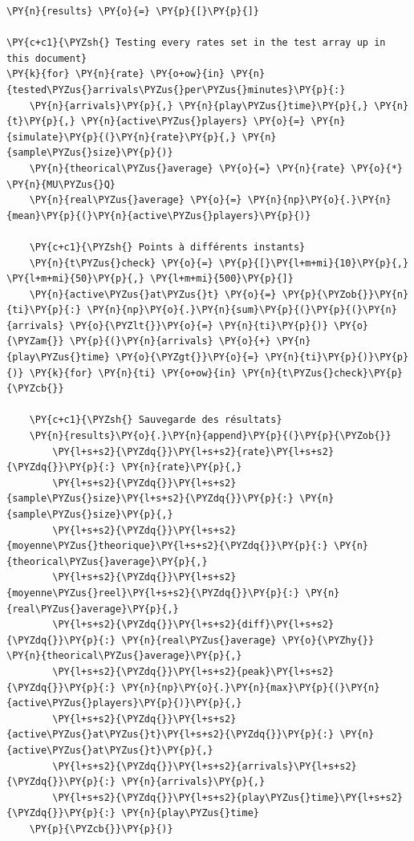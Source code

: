     \begin{tcolorbox}[breakable, size=fbox, boxrule=1pt, pad at break*=1mm,colback=cellbackground, colframe=cellborder]
\begin{Verbatim}[commandchars=\\\{\}]
\PY{n}{results} \PY{o}{=} \PY{p}{[}\PY{p}{]}

\PY{c+c1}{\PYZsh{} Testing every rates set in the test array up in this document}
\PY{k}{for} \PY{n}{rate} \PY{o+ow}{in} \PY{n}{tested\PYZus{}arrivals\PYZus{}per\PYZus{}minutes}\PY{p}{:}
    \PY{n}{arrivals}\PY{p}{,} \PY{n}{play\PYZus{}time}\PY{p}{,} \PY{n}{t}\PY{p}{,} \PY{n}{active\PYZus{}players} \PY{o}{=} \PY{n}{simulate}\PY{p}{(}\PY{n}{rate}\PY{p}{,} \PY{n}{sample\PYZus{}size}\PY{p}{)}
    \PY{n}{theorical\PYZus{}average} \PY{o}{=} \PY{n}{rate} \PY{o}{*} \PY{n}{MU\PYZus{}Q}
    \PY{n}{real\PYZus{}average} \PY{o}{=} \PY{n}{np}\PY{o}{.}\PY{n}{mean}\PY{p}{(}\PY{n}{active\PYZus{}players}\PY{p}{)}

    \PY{c+c1}{\PYZsh{} Points à différents instants}
    \PY{n}{t\PYZus{}check} \PY{o}{=} \PY{p}{[}\PY{l+m+mi}{10}\PY{p}{,} \PY{l+m+mi}{50}\PY{p}{,} \PY{l+m+mi}{500}\PY{p}{]}
    \PY{n}{active\PYZus{}at\PYZus{}t} \PY{o}{=} \PY{p}{\PYZob{}}\PY{n}{ti}\PY{p}{:} \PY{n}{np}\PY{o}{.}\PY{n}{sum}\PY{p}{(}\PY{p}{(}\PY{n}{arrivals} \PY{o}{\PYZlt{}}\PY{o}{=} \PY{n}{ti}\PY{p}{)} \PY{o}{\PYZam{}} \PY{p}{(}\PY{n}{arrivals} \PY{o}{+} \PY{n}{play\PYZus{}time} \PY{o}{\PYZgt{}}\PY{o}{=} \PY{n}{ti}\PY{p}{)}\PY{p}{)} \PY{k}{for} \PY{n}{ti} \PY{o+ow}{in} \PY{n}{t\PYZus{}check}\PY{p}{\PYZcb{}}

    \PY{c+c1}{\PYZsh{} Sauvegarde des résultats}
    \PY{n}{results}\PY{o}{.}\PY{n}{append}\PY{p}{(}\PY{p}{\PYZob{}}
        \PY{l+s+s2}{\PYZdq{}}\PY{l+s+s2}{rate}\PY{l+s+s2}{\PYZdq{}}\PY{p}{:} \PY{n}{rate}\PY{p}{,}
        \PY{l+s+s2}{\PYZdq{}}\PY{l+s+s2}{sample\PYZus{}size}\PY{l+s+s2}{\PYZdq{}}\PY{p}{:} \PY{n}{sample\PYZus{}size}\PY{p}{,}
        \PY{l+s+s2}{\PYZdq{}}\PY{l+s+s2}{moyenne\PYZus{}theorique}\PY{l+s+s2}{\PYZdq{}}\PY{p}{:} \PY{n}{theorical\PYZus{}average}\PY{p}{,}
        \PY{l+s+s2}{\PYZdq{}}\PY{l+s+s2}{moyenne\PYZus{}reel}\PY{l+s+s2}{\PYZdq{}}\PY{p}{:} \PY{n}{real\PYZus{}average}\PY{p}{,}
        \PY{l+s+s2}{\PYZdq{}}\PY{l+s+s2}{diff}\PY{l+s+s2}{\PYZdq{}}\PY{p}{:} \PY{n}{real\PYZus{}average} \PY{o}{\PYZhy{}} \PY{n}{theorical\PYZus{}average}\PY{p}{,}
        \PY{l+s+s2}{\PYZdq{}}\PY{l+s+s2}{peak}\PY{l+s+s2}{\PYZdq{}}\PY{p}{:} \PY{n}{np}\PY{o}{.}\PY{n}{max}\PY{p}{(}\PY{n}{active\PYZus{}players}\PY{p}{)}\PY{p}{,}
        \PY{l+s+s2}{\PYZdq{}}\PY{l+s+s2}{active\PYZus{}at\PYZus{}t}\PY{l+s+s2}{\PYZdq{}}\PY{p}{:} \PY{n}{active\PYZus{}at\PYZus{}t}\PY{p}{,}
        \PY{l+s+s2}{\PYZdq{}}\PY{l+s+s2}{arrivals}\PY{l+s+s2}{\PYZdq{}}\PY{p}{:} \PY{n}{arrivals}\PY{p}{,}
        \PY{l+s+s2}{\PYZdq{}}\PY{l+s+s2}{play\PYZus{}time}\PY{l+s+s2}{\PYZdq{}}\PY{p}{:} \PY{n}{play\PYZus{}time}
    \PY{p}{\PYZcb{}}\PY{p}{)}
\end{Verbatim}
\end{tcolorbox}

